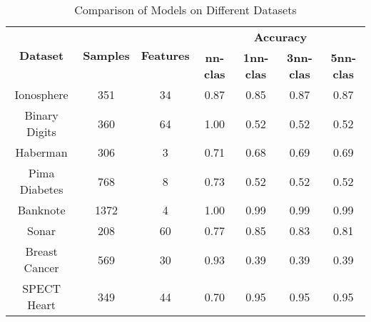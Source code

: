 \begin{table}[H]
\centering
\begin{tabular}{|c|c|c|c|c|c|c|}
\hline
\multirow{2}{*}{\textbf{Dataset}} & \multirow{2}{*}{\textbf{Samples}} & \multirow{2}{*}{\textbf{Features}} & \multicolumn{4}{c|}{\textbf{Accuracy}} \\ \cline{4-7}
 & & & \textbf{nn-clas} & \textbf{1nn-clas} & \textbf{3nn-clas} & \textbf{5nn-clas} \\ \hline
Ionosphere & 351 & 34 & 0.87 & 0.85 & 0.87 & 0.87 \\ \hline
Binary Digits & 360 & 64 & 1.00 & 0.52 & 0.52 & 0.52 \\ \hline
Haberman & 306 & 3 & 0.71 & 0.68 & 0.69 & 0.69 \\ \hline
Pima Diabetes & 768 & 8 & 0.73 & 0.52 & 0.52 & 0.52 \\ \hline
Banknote & 1372 & 4 & 1.00 & 0.99 & 0.99 & 0.99 \\ \hline
Sonar & 208 & 60 & 0.77 & 0.85 & 0.83 & 0.81 \\ \hline
Breast Cancer & 569 & 30 & 0.93 & 0.39 & 0.39 & 0.39 \\ \hline
SPECT Heart & 349 & 44 & 0.70 & 0.95 & 0.95 & 0.95 \\ \hline
\end{tabular}
\caption{Comparison of Models on Different Datasets}
\label{tab:comparison_results}
\end{table}